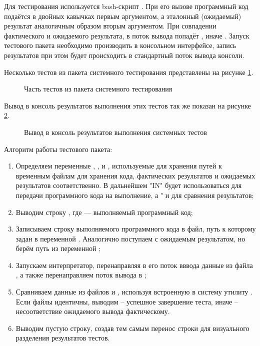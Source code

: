 Для тестирования используется bash-скрипт . При его вызове программный код подаётся в двойных кавычках первым аргументом, а эталонный (ожидаемый) результат аналогичным образом вторым аргументом. При совпадении фактического и ожидаемого результата, в поток вывода \cite{e28} попадёт , иначе . Запуск тестового пакета необходимо производить в консольном интерфейсе, запись результатов при этом будет происходить в стандартный поток вывода консоли.

Несколько тестов из пакета системного тестирования представлены на рисунке \ref{system_test_code:image}.

\begin{figure}[ht]
	\caption{Часть тестов из пакета системного тестирования}
	\label{system_test_code:image}
\end{figure}

Вывод в консоль результатов выполнения этих тестов так же показан на рисунке \ref{system_test_res:image}.

\begin{figure}[H]
	\caption{Вывод в консоль результатов выполнения системных тестов}
	\label{system_test_res:image}
\end{figure}

Алгоритм работы тестового пакета:

\begin{enumerate}
\item Определяем переменные , , и , используемые для хранения путей к временным файлам для хранения кода, фактических результатов и ожидаемых результатов соответственно. В дальнейшем "IN" будет использоваться для передачи программного кода на выполнение, а " и  для сравнения результатов;

\item Выводим строку , где  — выполняемый программный код;

\item Записываем строку выполняемого программного кода в файл, путь к которому задан в переменной . Аналогично поступаем с ожидаемым результатом, но берём путь из переменной ;

\item Запускаем интерпретатор, перенаправляя в его поток вввода данные из файла , а также перенаправляем поток вывода в ;

\item Сравниваем данные из файлов  и , используя встроенную в систему утилиту  \cite{e24}. Если файлы идентичны, выводим  -- успешное завершение теста, иначе  -- несоответствие ожидаемого вывода фактическому.

\item Выводим пустую строку, создав тем самым перенос строки для визуального разделения результатов тестов.

\end{enumerate}

